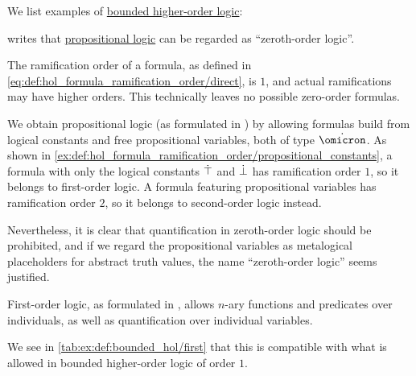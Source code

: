 \begin{example}\label{ex:def:bounded_hol}
  We list examples of \hyperref[def:bounded_hol]{bounded higher-order logic}:
  \begin{thmenum}
      writes that \hyperref[def:propositional_logic]{propositional logic} can be regarded as \enquote{zeroth-order logic}.

    The ramification order of a formula, as defined in \eqref{eq:def:hol_formula_ramification_order/direct}, is \( 1 \), and actual ramifications may have higher orders. This technically leaves no possible zero-order formulas.

    We obtain propositional logic (as formulated in ) by allowing formulas build from logical constants and free propositional variables, both of type \( \syn\omicron \). As shown in \cref{ex:def:hol_formula_ramification_order/propositional_constants}, a formula with only the logical constants \( \dot{\top} \) and \( \dot{\bot} \) has ramification order \( 1 \), so it belongs to first-order logic. A formula featuring propositional variables has ramification order \( 2 \), so it belongs to second-order logic instead.

    Nevertheless, it is clear that quantification in zeroth-order logic should be prohibited, and if we regard the propositional variables as metalogical placeholders for abstract truth values, the name \enquote{zeroth-order logic} seems justified.

     First-order logic, as formulated in , allows \( n \)-ary functions and predicates over individuals, as well as quantification over individual variables.

    We see in \cref{tab:ex:def:bounded_hol/first} that this is compatible with what is allowed in bounded higher-order logic of order \( 1 \).


\end{thmenum}
\end{example}
